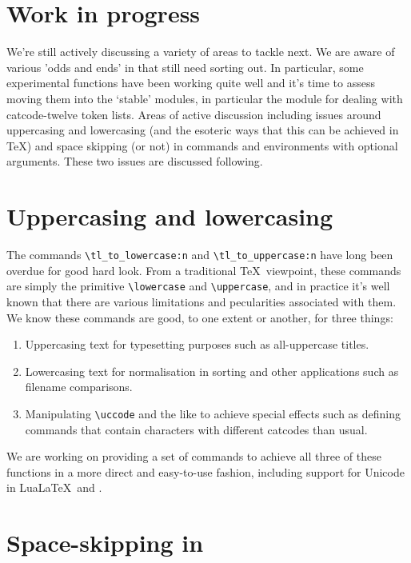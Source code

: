 \documentclass{ltnews}
\newcommand\LuaLaTeX{Lua\LaTeX}
\begin{document}
\section{Work in progress}

We're still actively discussing a variety of areas to tackle next.
We are aware of various 'odds and ends' in  that still need sorting out.
In particular, some experimental functions have been working quite well and it's time to assess moving them into the `stable' modules, in particular the  module for dealing with catcode-twelve token lists.
Areas of active discussion including issues around uppercasing and lowercasing (and the esoteric ways that this can be achieved in \TeX) and space skipping (or not) in commands and environments with optional arguments.
These two issues are discussed following.

\section{Uppercasing and lowercasing}

The commands \verb"\tl_to_lowercase:n" and \verb"\tl_to_uppercase:n" have long been overdue for good hard look.
From a traditional \TeX\ viewpoint, these commands are simply the primitive \verb"\lowercase" and \verb"\uppercase", and in practice it's well known that there are various limitations and pecularities associated with them.
We know these commands are good, to one extent or another, for three things:
\begin{enumerate}
\item
Uppercasing text for typesetting purposes such as all-uppercase titles.
\item
Lowercasing text for normalisation in sorting and other applications such as filename comparisons.
\item
Manipulating \verb"\uccode" and the like to achieve special effects such as defining commands that contain characters with different catcodes than usual.
\end{enumerate}
We are working on providing a set of commands to achieve all three of these functions in a more direct and easy-to-use fashion, including support for Unicode in \LuaLaTeX\ and \XeLaTeX.

\section{Space-skipping in }
\end{document}
